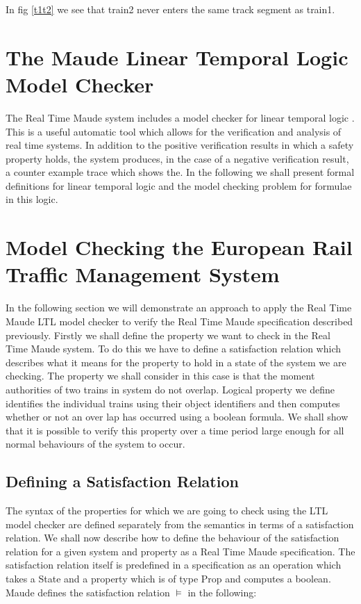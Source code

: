 In fig \ref{t1t2} we see that train2 never enters the same track segment as train1.

\section{The Maude Linear Temporal Logic Model Checker}
The Real Time Maude system includes a model checker for linear temporal logic \cite{ES00}.  This is a useful automatic tool which allows for the verification and analysis of real time systems. In addition to the positive verification results in which a safety property holds,  the system produces, in the case of a negative verification result, a counter example trace which shows the. In the following we shall present formal definitions for linear temporal logic and the model checking problem for formulae in this logic.

 

\section{Model Checking the European Rail Traffic Management System}
In the following section we will demonstrate an approach to apply the Real Time Maude LTL model checker to verify the Real Time Maude specification described previously.
Firstly we shall define the property we want to check in the Real Time Maude system. To do this we have to define a satisfaction relation which describes what it means for the property to hold in a state of the system we are checking.  The property we shall consider in this case is that the moment authorities of two trains in system do not overlap. Logical property we define identifies the individual trains using their object identifiers and then computes whether or not an over lap has occurred using a boolean formula.  We shall show that it is possible to verify this property over a time period large enough for all normal behaviours of the system to occur. 

\subsection*{Defining a Satisfaction Relation}
The syntax of the properties for which we are going to check using the LTL model checker are defined separately from the semantics in terms of a satisfaction relation.
We shall now describe how to define the behaviour of the satisfaction relation for a given system and property as a Real Time Maude specification. The satisfaction relation itself is predefined in a specification as an operation which takes a State and a property which is of type Prop and computes a boolean. Maude defines the satisfaction relation $\models$ in the following:
\medskip


